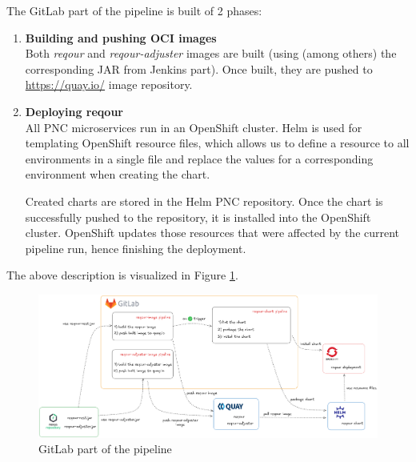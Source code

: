 \documentclass[../main.tex]{subfiles}
\begin{document}
The GitLab part of the pipeline is built of 2 phases:
\begin{enumerate}
    \item \textbf{Building and pushing OCI images}\\
    Both \textit{reqour} and \textit{reqour-adjuster} images are built (using (among others) the corresponding JAR from Jenkins part). Once built, they are pushed to \url{https://quay.io/} image repository.
    \item \textbf{Deploying reqour}\\
    All PNC microservices run in an OpenShift cluster. Helm is used for templating OpenShift resource files, which allows us to define a resource to all environments in a single file and replace the values for a corresponding environment when creating the chart.

    Created charts are stored in the Helm PNC repository. Once the chart is successfully pushed to the repository, it is installed into the OpenShift cluster. OpenShift updates those resources that were affected by the current pipeline run, hence finishing the deployment.
\end{enumerate}

The above description is visualized in Figure \ref{fig:gitlab}.

\begin{figure}
  \begin{center}
    \includegraphics[width=\textwidth]{images/gitlab.png}
  \end{center}
  \caption{GitLab part of the pipeline}
  \label{fig:gitlab}
\end{figure}
\end{document}
